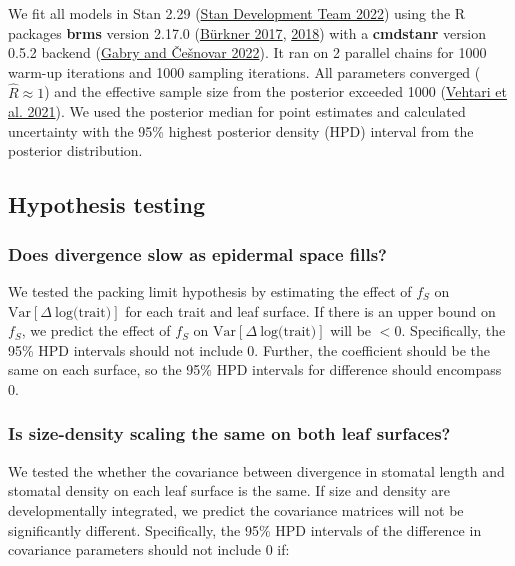 \documentclass[
  12pt,
]{article}
\begin{document}
We fit all models in Stan 2.29 (\protect\hyperlink{ref-stan_development_team_stan_2022}{Stan Development Team 2022}) using the R packages \textbf{brms} version 2.17.0 (\protect\hyperlink{ref-burkner_brms_2017}{Bürkner 2017}, \protect\hyperlink{ref-burkner_advanced_2018}{2018}) with a \textbf{cmdstanr} version 0.5.2 backend (\protect\hyperlink{ref-gabry_cmdstanr_2022}{Gabry and Češnovar 2022}). It ran on 2 parallel chains for 1000 warm-up iterations and 1000 sampling iterations. All parameters converged (\(\hat{R} \approx 1\)) and the effective sample size from the posterior exceeded 1000 (\protect\hyperlink{ref-vehtari_rank-normalization_2021}{Vehtari et al. 2021}). We used the posterior median for point estimates and calculated uncertainty with the 95\% highest posterior density (HPD) interval from the posterior distribution.

\hypertarget{hypothesis-testing}{%
\subsection{Hypothesis testing}\label{hypothesis-testing}}

\hypertarget{does-divergence-slow-as-epidermal-space-fills}{%
\subsubsection{Does divergence slow as epidermal space fills?}\label{does-divergence-slow-as-epidermal-space-fills}}

We tested the packing limit hypothesis by estimating the effect of \(f_S\) on \(\textrm{Var}[\Delta~\textrm{log(trait)}]\) for each trait and leaf surface. If there is an upper bound on \(f_S\), we predict the effect of \(f_S\) on \(\textrm{Var}[\Delta~\textrm{log(trait)}]\) will be \(<0\). Specifically, the 95\% HPD intervals should not include 0. Further, the coefficient should be the same on each surface, so the 95\% HPD intervals for difference should encompass 0.

\hypertarget{is-size-density-scaling-the-same-on-both-leaf-surfaces}{%
\subsubsection{Is size-density scaling the same on both leaf surfaces?}\label{is-size-density-scaling-the-same-on-both-leaf-surfaces}}

We tested the whether the covariance between divergence in stomatal length and stomatal density on each leaf surface is the same. If size and density are developmentally integrated, we predict the covariance matrices will not be significantly different. Specifically, the 95\% HPD intervals of the difference in covariance parameters should not include 0 if:
\end{document}
